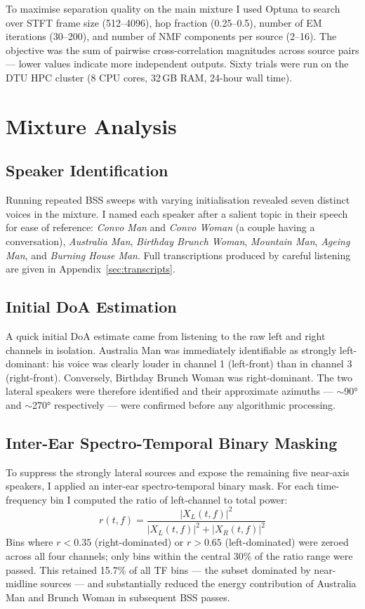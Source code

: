 To maximise separation quality on the main mixture I used Optuna \cite{} to search over STFT frame size (512–4096), hop fraction (0.25–0.5), number of EM iterations (30–200), and number of NMF components per source (2–16). The objective was the sum of pairwise cross-correlation magnitudes across source pairs — lower values indicate more independent outputs. Sixty trials were run on the DTU HPC cluster (8 CPU cores, 32\,GB RAM, 24-hour wall time).

\section{Mixture Analysis}

\subsection{Speaker Identification}

Running repeated BSS sweeps with varying initialisation revealed seven distinct voices in the mixture. I named each speaker after a salient topic in their speech for ease of reference: \textit{Convo Man} and \textit{Convo Woman} (a couple having a conversation), \textit{Australia Man}, \textit{Birthday Brunch Woman}, \textit{Mountain Man}, \textit{Ageing Man}, and \textit{Burning House Man}. Full transcriptions produced by careful listening are given in Appendix~\ref{sec:transcripts}.

\subsection{Initial DoA Estimation}

A quick initial DoA estimate came from listening to the raw left and right channels in isolation. Australia Man was immediately identifiable as strongly left-dominant: his voice was clearly louder in channel 1 (left-front) than in channel 3 (right-front). Conversely, Birthday Brunch Woman was right-dominant. The two lateral speakers were therefore identified and their approximate azimuths — $\sim$90° and $\sim$270° respectively — were confirmed before any algorithmic processing.

\subsection{Inter-Ear Spectro-Temporal Binary Masking}

To suppress the strongly lateral sources and expose the remaining five near-axis speakers, I applied an inter-ear spectro-temporal binary mask. For each time-frequency bin I computed the ratio of left-channel to total power:
\[
  r(t,f) = \frac{|X_L(t,f)|^2}{|X_L(t,f)|^2 + |X_R(t,f)|^2}
\]
Bins where $r < 0.35$ (right-dominated) or $r > 0.65$ (left-dominated) were zeroed across all four channels; only bins within the central 30\% of the ratio range were passed. This retained 15.7\% of all TF bins — the subset dominated by near-midline sources — and substantially reduced the energy contribution of Australia Man and Brunch Woman in subsequent BSS passes.

